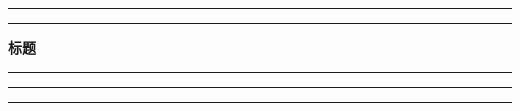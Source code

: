 
\thispagestyle{empty}
\begin{center}
  
  \rule{\textwidth}{1pt}\par %
  \vspace{2pt}\vspace{-\baselineskip} %
  \rule{\textwidth}{0.4pt}\par %
  \vspace{\drop} %
  
  {\LARGE\textbf{标题}}

  \vspace{0.25\drop} %
  \rule{0.5\textwidth}{0.4pt}\par %
  \vspace{\drop} %
  
  \vfill
  
  
\rule{\textwidth}{0.4pt}\par %
\vspace{2pt}\vspace{-\baselineskip} %
\rule{\textwidth}{1pt}\par %

  
\end{center}
